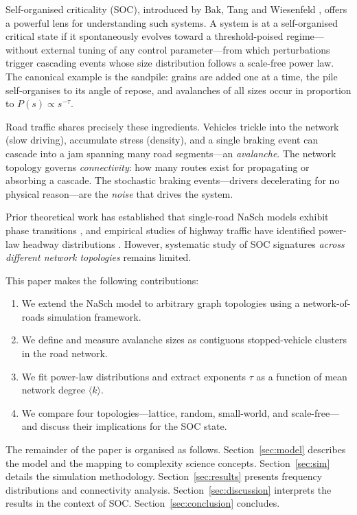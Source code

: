 \documentclass[12pt,a4paper]{article}
\begin{document}
Self-organised criticality (SOC), introduced by Bak, Tang and 
Wiesenfeld \citep{bak1987}, offers a powerful lens for understanding 
such systems. A system is at a self-organised critical state if it 
spontaneously evolves toward a threshold-poised regime—without 
external tuning of any control parameter—from which perturbations 
trigger cascading events whose size distribution follows a 
scale-free power law. The canonical example is the sandpile: grains 
are added one at a time, the pile self-organises to its angle of 
repose, and avalanches of all sizes occur in proportion to 
$P(s) \propto s^{-\tau}$.

Road traffic shares precisely these ingredients. Vehicles trickle 
into the network (slow driving), accumulate stress (density), and a 
single braking event can cascade into a jam spanning many road 
segments—an \emph{avalanche}. The network topology governs 
\emph{connectivity}: how many routes exist for propagating or 
absorbing a cascade. The stochastic braking events—drivers 
decelerating for no physical reason—are the \emph{noise} that 
drives the system.

Prior theoretical work has established that single-road NaSch models 
exhibit phase transitions \citep{nagel1992}, and empirical studies of 
highway traffic have identified power-law headway distributions 
\citep{kerner1998}. However, systematic study of SOC signatures 
\emph{across different network topologies} remains limited.

This paper makes the following contributions:
\begin{enumerate}[leftmargin=*, label=(\roman*)]
  \item We extend the NaSch model to arbitrary graph topologies using 
        a network-of-roads simulation framework.
  \item We define and measure avalanche sizes as contiguous stopped-vehicle 
        clusters in the road network.
  \item We fit power-law distributions and extract exponents $\tau$ 
        as a function of mean network degree $\langle k \rangle$.
  \item We compare four topologies—lattice, random, small-world, and 
        scale-free—and discuss their implications for the SOC state.
\end{enumerate}

The remainder of the paper is organised as follows. Section~\ref{sec:model} 
describes the model and the mapping to complexity science concepts. 
Section~\ref{sec:sim} details the simulation methodology. 
Section~\ref{sec:results} presents frequency distributions and 
connectivity analysis. Section~\ref{sec:discussion} interprets the 
results in the context of SOC. Section~\ref{sec:conclusion} concludes.
\end{document}
